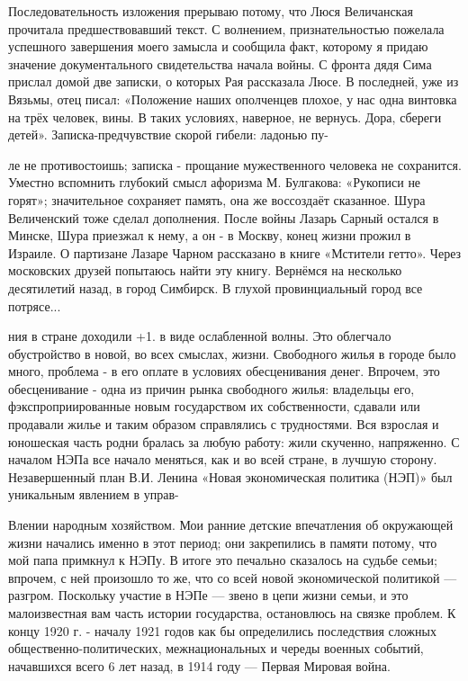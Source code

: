Последовательность изложения прерываю потому, что Люся Величанская прочитала предшествовавший текст. С волнением, признательностью пожелала успешного завершения моего замысла и сообщила факт, которому я придаю значение документального свидетельства начала войны. С фронта дядя Сима прислал домой две записки, о которых Рая рассказала Люсе. В последней, уже из Вязьмы, отец писал: «Положение наших ополченцев плохое, у нас одна винтовка на трёх человек, вины. В таких условиях, наверное, не вернусь. Дора, сбереги детей». Записка-предчувствие скорой гибели: ладонью пу-

ле не противостоишь; записка - прощание мужественного человека не сохранится. Уместно вспомнить глубокий смысл афоризма М. Булгакова: «Рукописи не горят»; значительное сохраняет память, она же воссоздаёт сказанное. Шура Величенский тоже сделал дополнения. После войны Лазарь Сарный остался в Минске, Шура приезжал к нему, а он - в Москву, конец жизни прожил в Израиле. О партизане Лазаре Чарном рассказано в книге «Мстители гетто». Через московских друзей попытаюсь найти эту книгу. Вернёмся на несколько десятилетий назад, в город Симбирск. В глухой провинциальный город все потрясе...

ния в стране доходили +1. в виде ослабленной волны. Это облегчало обустройство в новой, во всех смыслах, жизни. Свободного жилья в городе было много, проблема - в его оплате в условиях обесценивания денег. Впрочем, это обесценивание - одна из причин рынка свободного жилья: владельцы его, фэкспроприированные новым государством их собственности, сдавали или продавали жилье и таким образом справлялись с трудностями. Вся взрослая и юношеская часть родни бралась за любую работу: жили скученно, напряженно. С началом НЭПа все начало меняться, как и во всей стране, в лучшую сторону. Незавершенный план В.И. Ленина «Новая экономическая политика (НЭП)» был уникальным явлением в управ-

Влении народным хозяйством. Мои ранние детские впечатления об окружающей жизни начались именно в этот период; они закрепились в памяти потому, что мой папа примкнул к НЭПу. В итоге это печально сказалось на судьбе семьи; впрочем, с ней произошло то же, что со всей новой экономической политикой — разгром. Поскольку участие в НЭПе — звено в цепи жизни семьи, и это малоизвестная вам часть истории государства, остановлюсь на связке проблем. К концу 1920 г. - началу 1921 годов как бы определились последствия сложных общественно-политических, межнациональных и череды военных событий, начавшихся всего 6 лет назад, в 1914 году — Первая Мировая война.

